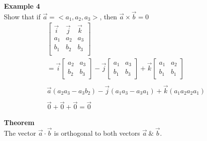 \documentclass{article}
\begin{document}
  \textbf{Example 4}\\
  Show that if $ \vec{a} = <a_1, a_2, a_3> $, then $ \vec{a} \times \vec{b} =0 $
  \[
    \begin{gathered}
    \begin{bmatrix}
      \vec{i} &\vec{j} &\vec{k}\\
      a_{1} &a_{2} &a_{3}\\
      b_{1} &b_{2} &b_{3}\\ 
    \end{bmatrix}\\
    = \vec{ i } \begin{bmatrix}
      a_2 &a_3\\
      b_2 &b_3
    \end{bmatrix} - 
    \vec{ j } \begin{bmatrix}
      a_1 &a_3\\
      b_1 &b_3
    \end{bmatrix} + 
    \vec{ k } \begin{bmatrix}
      a_1 &a_2\\
      b_1 &b_1
    \end{bmatrix}\\
    ~\\
    \vec{a}(a_{2} a_{3} -a_{3} b_{2} )-\vec{j}(a_{1} a_{3} -a_{3} a_{1} )+ \vec{k}(a_{1} a_{2} a_{2} a_{1} )\\
    ~\\
    \vec{0}+\vec{0}+\vec{0}=\boxed{\vec{0}} 
    \end{gathered}
  \] 
  

  \textbf{Theorem}\\
  The vector $ \vec{ a } \cdot \vec{ b } $ is orthogonal to both vectors $ \vec{ a } ~ \&~ \vec{ b }   $. 
\end{document}
